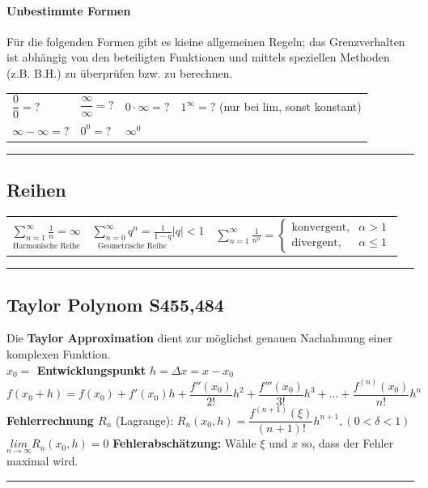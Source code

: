\documentclass[6pt,a4paper]{scrartcl}
\begin{document}
\begin{multicols*}{2}
\paragraph{Unbestimmte Formen}


Für die folgenden Formen gibt es kieine allgemeinen Regeln; das Grenzverhalten ist abhängig von den beteiligten Funktionen und mittels speziellen Methoden (z.B. B.H.) zu überprüfen bzw. zu berechnen.
\begin{tabular}{p{3cm}p{3cm}p{3cm}p{3cm}}
	$\dfrac{0}{0}=?$	&	$\dfrac{\infty}{\infty}=?$	&	$0\cdot \infty =?$	&	$1^{\infty}=?$ (nur bei lim, sonst konstant)\\
	$\infty-\infty=?$	&	$0^{0}=?$	&	$\infty ^{0}$	&\\
\end{tabular}

\hrule
\subsection{Reihen}
\begin{tabulary}{12cm}{LLL}
	
$\underset{\text{Harmonische Reihe}}{\sum_{n=1}^\infty \frac{1}{n} = \infty}$ & $\underset{\text{Geometrische Reihe}}{\sum_{n=0}^\infty q^n = \frac{1}{1-q}}$\qquad$|q|<1$&
$\sum_{n=1}^\infty \frac{1}{n^\alpha} = \begin{cases} \text{konvergent}, & \alpha > 1 \\ \text{divergent}, & \alpha \le 1 \end{cases}$\\
\end{tabulary}
\hrule
\subsection{Taylor Polynom \color{red}S455,484}
Die \textbf{Taylor Approximation} dient zur möglichst genauen Nachahmung einer komplexen Funktion.\\
\textbf{$x_{0}=$ Entwicklungspunkt} \qquad \underline{$h=\varDelta x=x-x_{0}$} \qquad $f(x_{0}+h)=f(x_{0})+f'(x_{0})h+\dfrac{f''(x_{0})}{2!}h^{2}+\dfrac{f'''(x_{0})}{3!}h^{3}+...+\dfrac{f^{(n)}(x_{0})}{n!}h^{n}$\\
\textbf{Fehlerrechnung $R_{n}$} (Lagrange): \qquad $R_{n}(x_{0},h)=\dfrac{f^{(n+1)}(\xi)}{(n+1)!}h^{n+1}, (0<\delta<1)$ \qquad \qquad
$\underset{n\rightarrow \infty}{lim} R_{n}(x_{0},h)=0$
\textbf{Fehlerabschätzung:} Wähle $\xi$ und $x$ so, dass der Fehler maximal wird.
\hrule

\end{multicols*}
\end{document}
